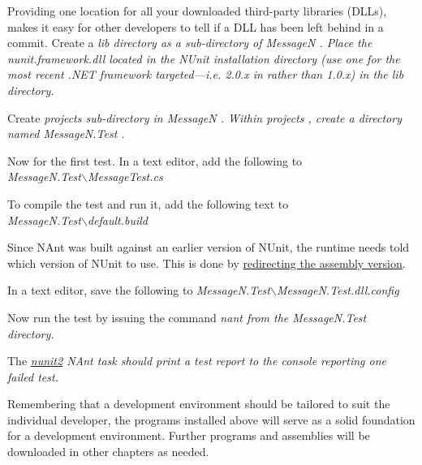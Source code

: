 Providing one location for all your downloaded third-party libraries (DLLs), makes it easy for other developers to tell if a DLL has been left behind in a commit. Create a \em lib \em directory as a sub-directory of \em MessageN \em. Place the \em nunit.framework.dll \em located in the NUnit installation directory (use one for the most recent .NET framework targeted---i.e. 2.0.x in rather than 1.0.x) in the \em lib \em directory.

Create \em projects \em sub-directory in \em MessageN \em. Within \em projects \em, create a directory named \em MessageN.Test \em.

Now for the first test. In a text editor, add the following to \\
\em MessageN.Test$\backslash$MessageTest.cs \em

 

To compile the test and run it, add the following text to \\
\em MessageN.Test$\backslash$default.build \em



Since NAnt was built against an earlier version of NUnit, the runtime needs told which version of NUnit to use. This is done by \href{http://msdn.microsoft.com/en-us/library/7wd6ex19(v=vs.71).aspx}{redirecting the assembly version}.

In a text editor, save the following to \em MessageN.Test$\backslash$MessageN.Test.dll.config \em



Now run the test by issuing the command \em nant \em from the \em MessageN.Test \em directory.

The \em \href{http://nant.sourceforge.net/release/latest/help/tasks/nunit2.html}{nunit2} \em NAnt task should print a test report to the console reporting one failed test.

Remembering that a development environment should be tailored to suit the individual developer, the programs installed above will serve as a solid foundation for a development environment. Further programs and assemblies will be downloaded in other chapters as needed.